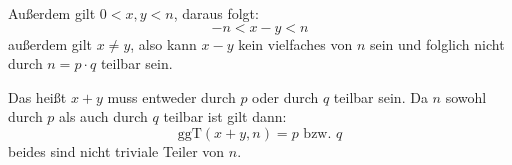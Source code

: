 \documentclass[DIN, pagenumber=false, fontsize=11pt, parskip=half]{scrartcl}
\begin{document}
    Außerdem gilt $0 < x, y < n$, daraus folgt:
    \begin{equation}
        -n < x - y < n
    \end{equation}
    außerdem gilt $x \neq y$, also kann $x-y$ kein vielfaches von $n$ sein und folglich
    nicht durch $n=p \cdot q$ teilbar sein.

    Das heißt $x+y$ muss entweder durch $p$ oder durch $q$ teilbar sein.
    Da $n$ sowohl durch $p$ als auch durch $q$ teilbar ist gilt dann:
    \begin{equation}
        \text{ggT}(x+y, n) = p \text{ bzw. } q
    \end{equation}
    beides sind nicht triviale Teiler von $n$.
    
\end{document}
